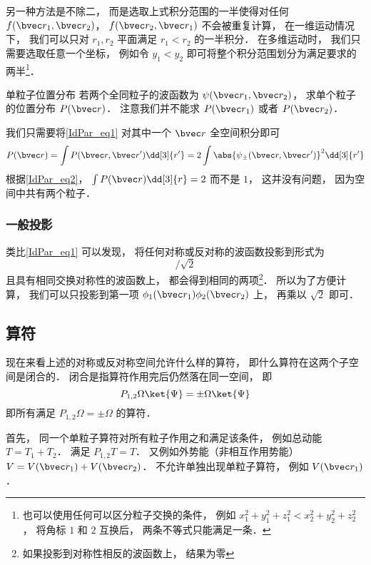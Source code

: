 另一种方法是不除二， 而是选取上式积分范围的一半使得对任何 $f(\bvec r_1, \bvec r_2)$， $f(\bvec r_2, \bvec r_1)$ 不会被重复计算， 在一维运动情况下， 我们可以只对 $r_1, r_2$ 平面满足 $r_1 < r_2$ 的一半积分． 在多维运动时， 我们只需要选取任意一个坐标， 例如令 $y_1 < y_2$ 即可将整个积分范围划分为满足要求的两半\footnote{也可以使用任何可以区分粒子交换的条件， 例如 $x_1^2 + y_1^2 + z_1^2 < x_2^2 + y_2^2 + z_2^2$， 将角标 $1$ 和 $2$ 互换后， 两条不等式只能满足一条．}．

\begin{example}{单粒子位置分布}\label{IdPar_ex1}
若两个全同粒子的波函数为 $\psi(\bvec r_1,\bvec r_2)$， 求单个粒子的位置分布 $P(\bvec r)$． 注意我们并不能求 $P(\bvec r_1)$ 或者 $P(\bvec r_2)$．

我们只需要将\autoref{IdPar_eq1} 对其中一个 $\bvec r$ 全空间积分即可
\begin{equation}
P(\bvec r) = \int P(\bvec r, \bvec r') \dd[3]{r'} = 2\int \abs{\psi_\pm(\bvec r, \bvec r')}^2 \dd[3]{r'} 
\end{equation}
根据\autoref{IdPar_eq2}， $\int P(\bvec r) \dd[3]{r} = 2$ 而不是 $1$， 这并没有问题， 因为空间中共有两个粒子．
\end{example}

\subsubsection{一般投影}
类比\autoref{IdPar_eq1} 可以发现， 将任何对称或反对称的波函数投影到形式为
\begin{equation}
[\phi_1(\bvec r_1)\phi_2(\bvec r_2) \pm \phi_2(\bvec r_1)\phi_1(\bvec r_2)]/\sqrt{2}
\end{equation}
且具有相同交换对称性的波函数上， 都会得到相同的两项\footnote{如果投影到对称性相反的波函数上， 结果为零}． 所以为了方便计算， 我们可以只投影到第一项 $\phi_1(\bvec r_1)\phi_2(\bvec r_2)$ 上， 再乘以 $\sqrt{2}$ 即可．

\subsection{算符}
现在来看上述的对称或反对称空间允许什么样的算符， 即什么算符在这两个子空间是闭合的． 闭合是指算符作用完后仍然落在同一空间， 即
\begin{equation}
P_{1,2}\Omega\ket{\Psi} = \pm \Omega \ket{\Psi}
\end{equation}
即所有满足 $P_{1,2}\Omega = \pm \Omega$ 的算符．

首先， 同一个单粒子算符对所有粒子作用之和满足该条件， 例如总动能 $T = T_1 + T_2$． 满足 $P_{1,2}T = T$． 又例如外势能（非相互作用势能） $V = V(\bvec r_1) + V(\bvec r_2)$． 不允许单独出现单粒子算符， 例如 $V(\bvec r_1)$．

